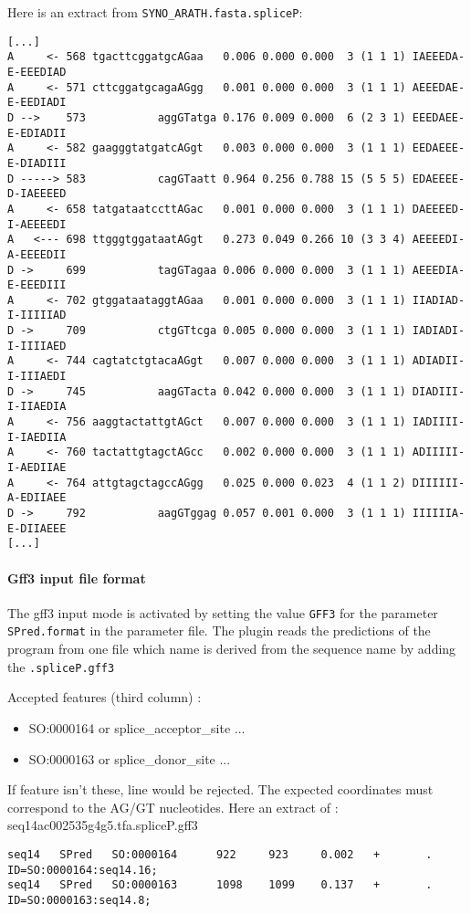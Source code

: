 Here is an extract from \texttt{SYNO\_ARATH.fasta.spliceP}:
\begin{Verbatim}[fontsize=\small]
[...]
A     <- 568 tgacttcggatgcAGaa   0.006 0.000 0.000  3 (1 1 1) IAEEEDA-E-EEEDIAD
A     <- 571 cttcggatgcagaAGgg   0.001 0.000 0.000  3 (1 1 1) AEEEDAE-E-EEDIADI
D -->    573           aggGTatga 0.176 0.009 0.000  6 (2 3 1) EEEDAEE-E-EDIADII
A     <- 582 gaagggtatgatcAGgt   0.003 0.000 0.000  3 (1 1 1) EEDAEEE-E-DIADIII
D -----> 583           cagGTaatt 0.964 0.256 0.788 15 (5 5 5) EDAEEEE-D-IAEEEED
A     <- 658 tatgataatccttAGac   0.001 0.000 0.000  3 (1 1 1) DAEEEED-I-AEEEEDI
A   <--- 698 ttgggtggataatAGgt   0.273 0.049 0.266 10 (3 3 4) AEEEEDI-A-EEEEDII
D ->     699           tagGTagaa 0.006 0.000 0.000  3 (1 1 1) AEEEDIA-E-EEEDIII
A     <- 702 gtggataataggtAGaa   0.001 0.000 0.000  3 (1 1 1) IIADIAD-I-IIIIIAD
D ->     709           ctgGTtcga 0.005 0.000 0.000  3 (1 1 1) IADIADI-I-IIIIAED
A     <- 744 cagtatctgtacaAGgt   0.007 0.000 0.000  3 (1 1 1) ADIADII-I-IIIAEDI
D ->     745           aagGTacta 0.042 0.000 0.000  3 (1 1 1) DIADIII-I-IIAEDIA
A     <- 756 aaggtactattgtAGct   0.007 0.000 0.000  3 (1 1 1) IADIIII-I-IAEDIIA
A     <- 760 tactattgtagctAGcc   0.002 0.000 0.000  3 (1 1 1) ADIIIII-I-AEDIIAE
A     <- 764 attgtagctagccAGgg   0.025 0.000 0.023  4 (1 1 2) DIIIIII-A-EDIIAEE
D ->     792           aagGTggag 0.057 0.001 0.000  3 (1 1 1) IIIIIIA-E-DIIAEEE
[...]
\end{Verbatim}

\paragraph{Gff3 input file format}
The gff3 input mode is activated by setting the value \texttt{GFF3} for the parameter
\texttt{SPred.format} in the parameter file.
The plugin reads the predictions of the program from one file which
name is derived from the sequence name by adding the \texttt{.spliceP.gff3}

Accepted features (third column) :
\begin{itemize}
\item  SO:0000164 or splice\_acceptor\_site ...
\item  SO:0000163 or splice\_donor\_site ...
\end{itemize}
If feature isn't these, line would be rejected. The expected coordinates must correspond to the AG/GT nucleotides.
Here an extract of : seq14ac002535g4g5.tfa.spliceP.gff3
\begin{Verbatim}[fontsize=\tiny]
seq14   SPred   SO:0000164      922     923     0.002   +       .       ID=SO:0000164:seq14.16;
seq14   SPred   SO:0000163      1098    1099    0.137   +       .       ID=SO:0000163:seq14.8;
\end{Verbatim}

